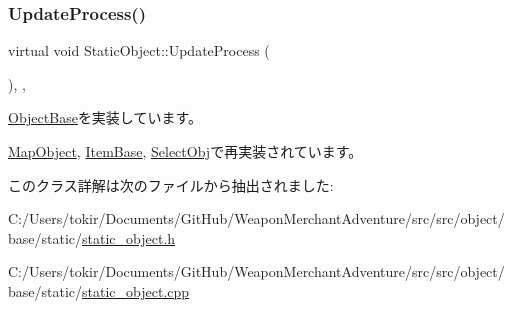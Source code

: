 \subsubsection{\texorpdfstring{Update\+Process()}{UpdateProcess()}}
{\footnotesize\ttfamily virtual void Static\+Object\+::\+Update\+Process (\begin{DoxyParamCaption}{ }\end{DoxyParamCaption})\hspace{0.3cm}{\ttfamily [inline]}, {\ttfamily [protected]}, {\ttfamily [virtual]}}



\mbox{\hyperlink{class_object_base_a8b5b72b363a419767efde0b0e692ea95}{Object\+Base}}を実装しています。



\mbox{\hyperlink{class_map_object_ab6b8849f15175417eca94b2703945e4b}{Map\+Object}}, \mbox{\hyperlink{class_item_base_a8edff8edcf884f9590f973fd05d218bc}{Item\+Base}}, \mbox{\hyperlink{class_select_obj_a4788d957629f0b69dc78166f09f949bb}{Select\+Obj}}で再実装されています。



このクラス詳解は次のファイルから抽出されました\+:\begin{DoxyCompactItemize}
\item 
C\+:/\+Users/tokir/\+Documents/\+Git\+Hub/\+Weapon\+Merchant\+Adventure/src/src/object/base/static/\mbox{\hyperlink{static__object_8h}{static\+\_\+object.\+h}}\item 
C\+:/\+Users/tokir/\+Documents/\+Git\+Hub/\+Weapon\+Merchant\+Adventure/src/src/object/base/static/\mbox{\hyperlink{static__object_8cpp}{static\+\_\+object.\+cpp}}\end{DoxyCompactItemize}
